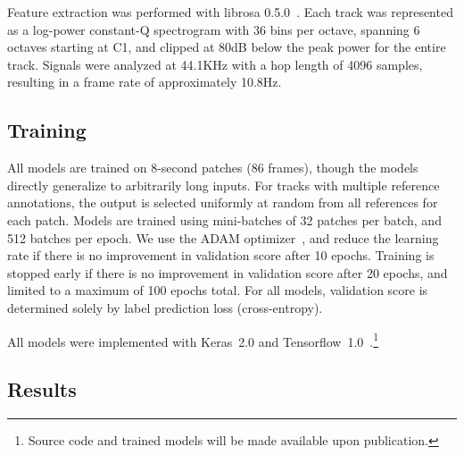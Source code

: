 \documentclass{article}
\begin{document}
Feature extraction was performed with librosa 0.5.0~\cite{librosa050}.
Each track was represented as a log-power constant-Q spectrogram with 36 bins per octave, spanning 6 octaves starting at C1, and clipped at 80dB below the peak power for the entire track.
Signals were analyzed at 44.1KHz with a hop length of 4096 samples, resulting in a frame rate of approximately 10.8Hz.

\subsection{Training}
All models are trained on 8-second patches (86 frames), though the models directly generalize to arbitrarily long inputs.
For tracks with multiple reference annotations, the output is selected uniformly at random from all references for each patch.
Models are trained using mini-batches of 32 patches per batch, and 512 batches per epoch.
We use the ADAM optimizer~\cite{kingma2014adam}, and reduce the learning rate if there is no improvement in validation score after 10 epochs.
Training is stopped early if there is no improvement in validation score after 20 epochs, and limited to a maximum of 100 epochs total.
For all models, validation score is determined solely by label prediction loss (cross-entropy).


All models were implemented with Keras~2.0 and Tensorflow~1.0~\cite{chollet2015keras, tensorflow2015-whitepaper}.\footnote{Source code and trained models will be made available upon publication.}

\subsection{Results}
\end{document}
